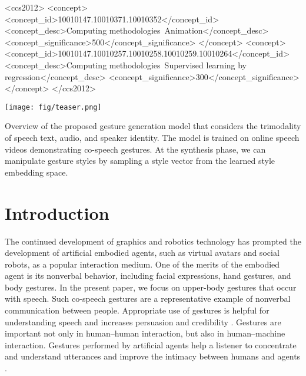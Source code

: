 \documentclass[acmtog]{acmart}
\begin{document}
\begin{CCSXML}
<ccs2012>
<concept>
<concept_id>10010147.10010371.10010352</concept_id>
<concept_desc>Computing methodologies~Animation</concept_desc>
<concept_significance>500</concept_significance>
</concept>
<concept>
<concept_id>10010147.10010257.10010258.10010259.10010264</concept_id>
<concept_desc>Computing methodologies~Supervised learning by regression</concept_desc>
<concept_significance>300</concept_significance>
</concept>
</ccs2012>
\end{CCSXML}





\begin{teaserfigure}
  \centering
  \texttt{[image: fig/teaser.png]}
  \caption{Overview of the proposed gesture generation model that considers the trimodality of speech text, audio, and speaker identity. The model is trained on online speech videos demonstrating co-speech gestures. At the synthesis phase, we can manipulate gesture styles by sampling a style vector from the learned style embedding space.}
  \label{fig:teaser}
\end{teaserfigure} \maketitle
\section{Introduction}

The continued development of graphics and robotics technology has prompted the development of artificial embodied agents, such as virtual avatars and social robots, as a popular interaction medium. One of the merits of the embodied agent is its nonverbal behavior, including facial expressions, hand gestures, and body gestures. In the present paper, we focus on upper-body gestures that occur with speech. Such co-speech gestures are a representative example of nonverbal communication between people. Appropriate use of gestures is helpful for understanding speech \cite{mcneill1992hand} and increases persuasion and credibility \cite{burgoon1990nonverbal}. Gestures are important not only in human--human interaction, but also in human--machine interaction. Gestures performed by artificial agents help a listener to concentrate and understand utterances \cite{bremner2011effects} and improve the intimacy between humans and agents \cite{wilson2017hand}.
\end{document}
